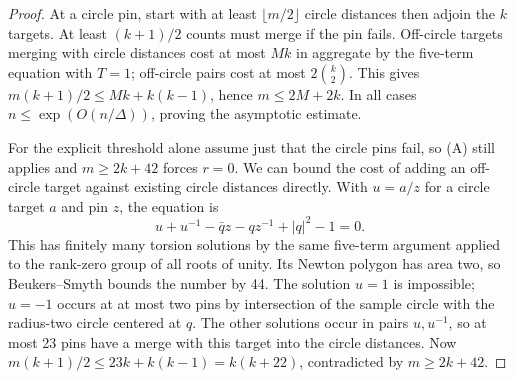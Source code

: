 \begin{proof}
At a circle pin, start with at least \(\lfloor m/2\rfloor\) circle distances then adjoin the \(k\) targets. At least \((k+1)/2\) counts must merge if the pin fails. Off-circle targets merging with circle distances cost at most \(Mk\) in aggregate by the five-term equation with \(T=1\); off-circle pairs cost at most \(2\binom k2\). This gives \(m(k+1)/2\le Mk+k(k-1)\), hence \(m\le2M+2k\). In all cases \(n\le\exp(O(n/\Delta))\), proving the asymptotic estimate.

For the explicit threshold alone assume just that the circle pins fail, so (A) still applies and \(m\ge2k+42\) forces \(r=0\). We can bound the cost of adding an off-circle target against existing circle distances directly. With \(u=a/z\) for a circle target \(a\) and pin \(z\), the equation is
\[
 u+u^{-1}-\bar q z-qz^{-1}+|q|^2-1=0.
\]
This has finitely many torsion solutions by the same five-term argument applied to the rank-zero group of all roots of unity. Its Newton polygon has area two, so Beukers--Smyth \cite{bs} bounds the number by 44. The solution \(u=1\) is impossible; \(u=-1\) occurs at at most two pins by intersection of the sample circle with the radius-two circle centered at \(q\). The other solutions occur in pairs \(u,u^{-1}\), so at most 23 pins have a merge with this target into the circle distances.
Now \(m(k+1)/2\le23k+k(k-1)=k(k+22)\), contradicted by \(m\ge2k+42\).
\end{proof}
